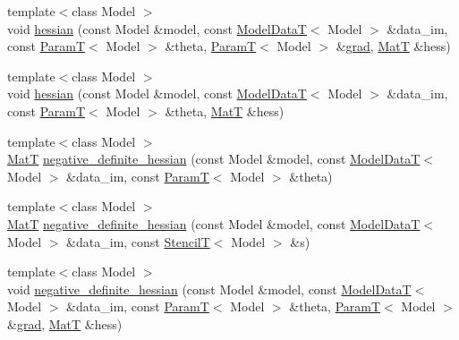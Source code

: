 \begin{DoxyCompactItemize}
\item 
{\footnotesize template$<$class Model $>$ }\\void \hyperlink{namespacemappel_1_1methods_1_1objective_a5c451515f6ec9eae7ffd321b9b8f95f1}{hessian} (const Model \&model, const \hyperlink{namespacemappel_a97f050df953605381ae9c901c3b125f1}{Model\+DataT}$<$ Model $>$ \&data\+\_\+im, const \hyperlink{namespacemappel_a667925cb0d6c0e49f2f035cc5a9a6857}{ParamT}$<$ Model $>$ \&theta, \hyperlink{namespacemappel_a667925cb0d6c0e49f2f035cc5a9a6857}{ParamT}$<$ Model $>$ \&\hyperlink{namespacemappel_1_1methods_1_1objective_a8e120e5a79029803453cea5f9f2d8f67}{grad}, \hyperlink{namespacemappel_a7091ab87c528041f7e2027195fad8915}{MatT} \&hess)
\item 
{\footnotesize template$<$class Model $>$ }\\void \hyperlink{namespacemappel_1_1methods_1_1objective_a0c7b3cd5fa4327c8f75e56937b2e616d}{hessian} (const Model \&model, const \hyperlink{namespacemappel_a97f050df953605381ae9c901c3b125f1}{Model\+DataT}$<$ Model $>$ \&data\+\_\+im, const \hyperlink{namespacemappel_a667925cb0d6c0e49f2f035cc5a9a6857}{ParamT}$<$ Model $>$ \&theta, \hyperlink{namespacemappel_a7091ab87c528041f7e2027195fad8915}{MatT} \&hess)
\item 
{\footnotesize template$<$class Model $>$ }\\\hyperlink{namespacemappel_a7091ab87c528041f7e2027195fad8915}{MatT} \hyperlink{namespacemappel_1_1methods_1_1objective_a1ea67c58d320c1634d8c69f834359029}{negative\+\_\+definite\+\_\+hessian} (const Model \&model, const \hyperlink{namespacemappel_a97f050df953605381ae9c901c3b125f1}{Model\+DataT}$<$ Model $>$ \&data\+\_\+im, const \hyperlink{namespacemappel_a667925cb0d6c0e49f2f035cc5a9a6857}{ParamT}$<$ Model $>$ \&theta)
\item 
{\footnotesize template$<$class Model $>$ }\\\hyperlink{namespacemappel_a7091ab87c528041f7e2027195fad8915}{MatT} \hyperlink{namespacemappel_1_1methods_1_1objective_aff95eac9143ee05d2611aa0c5b605f4c}{negative\+\_\+definite\+\_\+hessian} (const Model \&model, const \hyperlink{namespacemappel_a97f050df953605381ae9c901c3b125f1}{Model\+DataT}$<$ Model $>$ \&data\+\_\+im, const \hyperlink{namespacemappel_a3a06598240007876f8c4bf834ad86197}{StencilT}$<$ Model $>$ \&s)
\item 
{\footnotesize template$<$class Model $>$ }\\void \hyperlink{namespacemappel_1_1methods_1_1objective_a5f339b29348c61937b1ae42ef963b592}{negative\+\_\+definite\+\_\+hessian} (const Model \&model, const \hyperlink{namespacemappel_a97f050df953605381ae9c901c3b125f1}{Model\+DataT}$<$ Model $>$ \&data\+\_\+im, const \hyperlink{namespacemappel_a667925cb0d6c0e49f2f035cc5a9a6857}{ParamT}$<$ Model $>$ \&theta, \hyperlink{namespacemappel_a667925cb0d6c0e49f2f035cc5a9a6857}{ParamT}$<$ Model $>$ \&\hyperlink{namespacemappel_1_1methods_1_1objective_a8e120e5a79029803453cea5f9f2d8f67}{grad}, \hyperlink{namespacemappel_a7091ab87c528041f7e2027195fad8915}{MatT} \&hess)

\end{DoxyCompactItemize}
